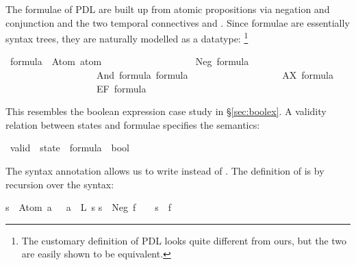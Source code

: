 %
\begin{isabellebody}%
\def\isabellecontext{PDL}%
\isamarkupfalse%
%
\isamarkuptrue%
%
\begin{isamarkuptext}%
The formulae of PDL are built up from atomic propositions via
negation and conjunction and the two temporal
connectives  and \@. Since formulae are essentially
syntax trees, they are naturally modelled as a datatype:%
\footnote{The customary definition of PDL
\cite{HarelKT-DL} looks quite different from ours, but the two are easily
shown to be equivalent.}%
\end{isamarkuptext}%
\isamarkuptrue%
\ formula\ {\isacharequal}\ Atom\ atom\isanewline
\ \ \ \ \ \ \ \ \ \ \ \ \ \ \ \ \ \ {\isacharbar}\ Neg\ formula\isanewline
\ \ \ \ \ \ \ \ \ \ \ \ \ \ \ \ \ \ {\isacharbar}\ And\ formula\ formula\isanewline
\ \ \ \ \ \ \ \ \ \ \ \ \ \ \ \ \ \ {\isacharbar}\ AX\ formula\isanewline
\ \ \ \ \ \ \ \ \ \ \ \ \ \ \ \ \ \ {\isacharbar}\ EF\ formula\isamarkupfalse%
%
\begin{isamarkuptext}%
\noindent
This resembles the boolean expression case study in
\S\ref{sec:boolex}.
A validity relation between
states and formulae specifies the semantics:%
\end{isamarkuptext}%
\isamarkuptrue%
\ valid\ {\isacharcolon}{\isacharcolon}\ {\isachardoublequote}state\ {\isasymRightarrow}\ formula\ {\isasymRightarrow}\ bool{\isachardoublequote}\ \ \ {\isacharparenleft}{\isachardoublequote}{\isacharparenleft}{\isacharunderscore}\ {\isasymTurnstile}\ {\isacharunderscore}{\isacharparenright}{\isachardoublequote}\ {\isacharbrackleft}{}{}{\isacharcomma}{}{}{\isacharbrackright}\ {}{}{\isacharparenright}\isamarkupfalse%
%
\begin{isamarkuptext}%
\noindent
The syntax annotation allows us to write  instead of
\hbox{}.
The definition of \isa{{\isasymTurnstile}} is by recursion over the syntax:%
\end{isamarkuptext}%
\isamarkuptrue%
\isanewline
{\isachardoublequote}s\ {\isasymTurnstile}\ Atom\ a\ \ {\isacharequal}\ {\isacharparenleft}a\ {\isasymin}\ L\ s{\isacharparenright}{\isachardoublequote}\isanewline
{\isachardoublequote}s\ {\isasymTurnstile}\ Neg\ f\ \ \ {\isacharequal}\ {\isacharparenleft}{\isasymnot}{\isacharparenleft}s\ {\isasymTurnstile}\ f{\isacharparenright}{\isacharparenright}{\isachardoublequote}\isanewline

\end{isabellebody}
